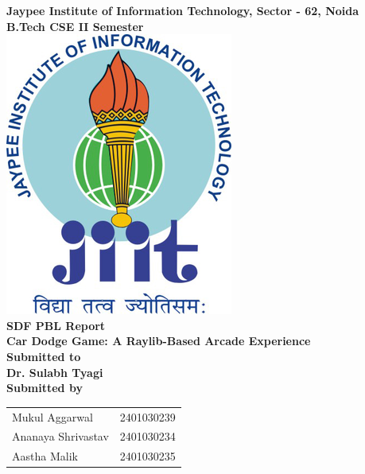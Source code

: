 \documentclass[12pt,a4paper]{article}
\begin{document}
\begin{titlepage}
    \centering
    \Huge
    \textbf{Jaypee Institute of Information Technology, Sector - 62, Noida} \\
    \vspace{0.5cm}
    \Large
    \textbf{B.Tech CSE II Semester} \\
    \vspace{1cm}
    \vspace*{\fill}
    \includegraphics[scale=3]{jiit_logo} \\
    \vspace{1.5cm}
    \Huge
    \textbf{SDF PBL Report} \\
    \Large
    \textbf{Car Dodge Game: A Raylib-Based Arcade Experience} \\
    \vspace{1cm}
    \Large
    \textbf{Submitted to} \\
    \textbf{Dr. Sulabh Tyagi} \\
    \vspace{1cm}
    \textbf{Submitted by} \\
    \vspace{0.5cm}
    \begin{tabular}{ll}
        Mukul Aggarwal & 2401030239 \\
        Ananaya Shrivastav & 2401030234 \\
        Aastha Malik & 2401030235 \\
    \end{tabular}
    \vspace*{\fill}
    \normalsize
\end{titlepage}
\end{document}
